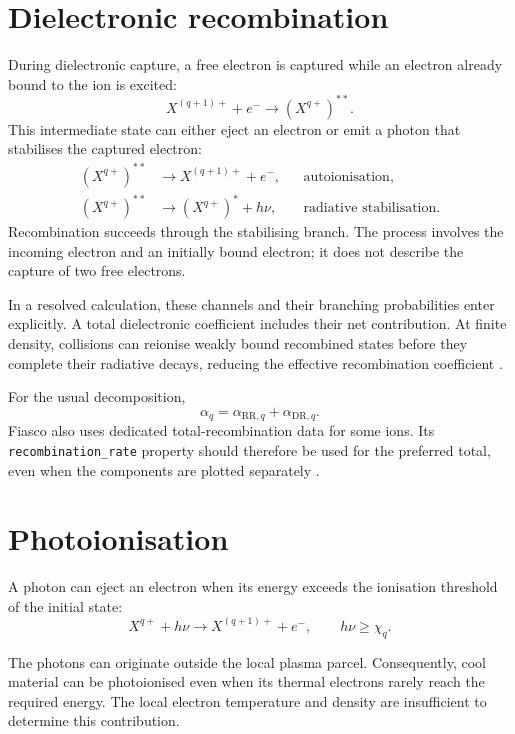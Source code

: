 \documentclass[a4paper,10pt,twoside,openany]{book}
\numberwithin{equation}{chapter}
\begin{document}
\section{Dielectronic recombination}
During dielectronic capture, a free electron is captured while an
electron already bound to the ion is excited:
\begin{equation}
  X^{(q+1)+}+e^-\longrightarrow (X^{q+})^{**}.
\end{equation}
This intermediate state can either eject an electron or emit a
photon that stabilises the captured electron:
\begin{align}
  (X^{q+})^{**}
    &\longrightarrow X^{(q+1)+}+e^-,
    &&\text{autoionisation},\\
  (X^{q+})^{**}
    &\longrightarrow (X^{q+})^{*}+h\nu,
    &&\text{radiative stabilisation}.
\end{align}
Recombination succeeds through the stabilising branch. The process
involves the incoming electron and an initially bound electron;
it does not describe the capture of two free electrons.

In a resolved calculation, these channels and their branching
probabilities enter explicitly. A total dielectronic coefficient
includes their net contribution. At finite density, collisions can
reionise weakly bound recombined states before they complete their
radiative decays, reducing the effective recombination coefficient
\cite{Nikolic2018}.

For the usual decomposition,
\begin{equation}
  \alpha_q=\alpha_{\mathrm{RR},q}
           +\alpha_{\mathrm{DR},q}.
\end{equation}
Fiasco also uses dedicated total-recombination data for some ions.
Its \texttt{recombination\_rate} property should therefore be used
for the preferred total, even when the components are plotted
separately \cite{FiascoDocs}.

\section{Photoionisation}
A photon can eject an electron when its energy exceeds the
ionisation threshold of the initial state:
\begin{equation}
  X^{q+}+h\nu\longrightarrow X^{(q+1)+}+e^-,
  \qquad h\nu\geq\chi_q.
\end{equation}

The photons can originate outside the local plasma parcel.
Consequently, cool material can be photoionised even when its
thermal electrons rarely reach the required energy. The local
electron temperature and density are insufficient to determine
this contribution.
\end{document}
